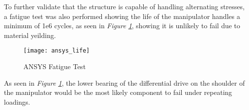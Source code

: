 To further validate that the structure is capable of handling alternating stresses, a fatigue test was also performed showing the life of the manipulator handles a minimum of 1e6 cycles, as seen in \emph{Figure \ref{fig:ansys_life}}, showing it is unlikely to fail due to material yeilding.

\begin{figure}[htp]
  \center
  \texttt{[image: ansys\_life]}
  \caption{ANSYS Fatigue Test}
  \label{fig:ansys_life}
\end{figure}

As seen in \emph{Figure \ref{fig:ansys_life}}, the lower bearing of the differential drive on the shoulder of the manipulator would be the most likely component to fail under repeating loadings.
